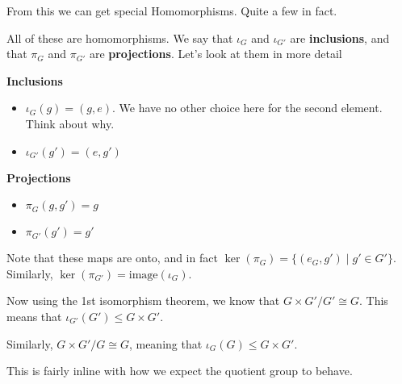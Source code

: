 \documentclass[12pt]{article}
\def\image{\text{image}}
\begin{document}


From this we can get special Homomorphisms. Quite a few in fact.

\begin{center}
\end{center}

All of these are homomorphisms. We say that $\iota_G$ and $\iota_{G'}$ are {\bf
inclusions}, and that $\pi_G$ and $\pi_{G'}$ are {\bf projections}. Let's look
at them in more detail

{\bf Inclusions}
\begin{itemize}
  \item $\iota_G(g) = (g, e)$. We have no other choice here for the second
    element. Think about why.
  \item $\iota_{G'}(g') = (e, g')$
\end{itemize}

{\bf Projections}
\begin{itemize}
  \item $\pi_G(g, g') = g$
  \item $\pi_{G'}(g') = g'$
\end{itemize}

Note that these maps are onto, and in fact $\ker(\pi_G) = \{ (e_{G}, g') \mid g'
\in G' \}$. Similarly, $\ker(\pi_{G'}) = \image(\iota_G)$.

Now using the 1st isomorphism theorem, we know that $G \times G' / G' \cong G$.
This means that $\iota_{G'}(G') \le G \times G'$.

Similarly, $G \times G' / G \cong G$, meaning that $\iota_G(G) \le G \times G'$.

This is fairly inline with how we expect the quotient group to behave.
\end{document}
